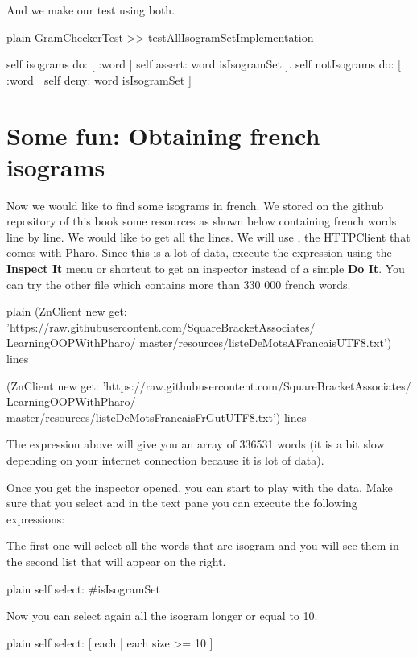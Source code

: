 \documentclass[10pt,twoside,english]{_support/latex/sbabook/sbabook}
\begin{document}
And we make our test using both. 

\begin{displaycode}{plain}
GramCheckerTest >> testAllIsogramSetImplementation
	
	self isograms do: [ :word |
		self assert: word isIsogramSet ].
	self notIsograms do: [ :word |
		self deny: word isIsogramSet ]
\end{displaycode}
\section{Some fun: Obtaining french isograms}
Now we would like to find some isograms in french. We stored on the github repository of this book some resources as shown below containing french words line by line. We would like to get all the lines. We will use , the HTTPClient that comes with Pharo.
 Since this is a lot of data, execute the expression using the \textbf{Inspect It} menu or shortcut to get an inspector instead of a simple \textbf{Do It}.
 You can try the other file which contains more than 330 000 french words.

\begin{displaycode}{plain}
(ZnClient new 
    get: 'https://raw.githubusercontent.com/SquareBracketAssociates/
	LearningOOPWithPharo/
	master/resources/listeDeMotsAFrancaisUTF8.txt') lines

(ZnClient new 
    get: 'https://raw.githubusercontent.com/SquareBracketAssociates/
	LearningOOPWithPharo/
	master/resources/listeDeMotsFrancaisFrGutUTF8.txt') lines
\end{displaycode}

The expression above will give you an array of 336531 words (it is a bit slow depending on your internet connection because it is lot of data).

Once you get the inspector opened, you can start to play with the data.
Make sure that you select  and 
in the text pane you can execute the following expressions:

The first one will select all the words that are isogram and you will see them in the second list that will appear on the right. 

\begin{displaycode}{plain}
self select: #isIsogramSet
\end{displaycode}

Now you can select again all the isogram longer or equal to 10. 

\begin{displaycode}{plain}
self select: [:each | each size >= 10 ]
\end{displaycode}
\end{document}

